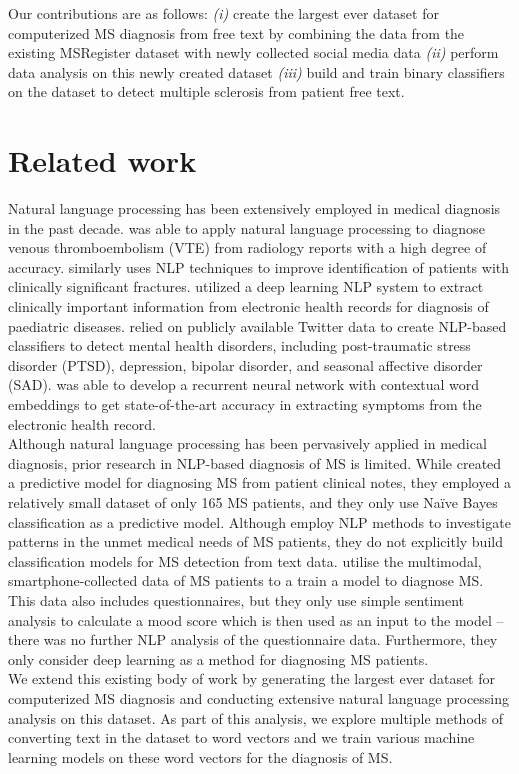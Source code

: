 \documentclass[11pt,a4paper]{article}
\begin{document}
\indent Our contributions are as follows: \emph{(i)} create the largest ever dataset for computerized MS diagnosis from free text by combining the data from the existing MSRegister dataset with newly collected social media data \emph{(ii)} perform data analysis on this newly created dataset \emph{(iii)} build and train binary classifiers on the dataset to detect multiple sclerosis from patient free text.
\section{Related work}
Natural language processing has been extensively employed in medical diagnosis in the past decade. \citet{Swartz:17} was able to apply natural language processing to diagnose venous thromboembolism (VTE) from radiology reports with a high degree of accuracy.
\citet{Kolanu:20} similarly uses NLP techniques to improve identification of patients with clinically significant fractures. \citet{Liang:19} utilized a deep learning NLP system to extract clinically important information from electronic health records for diagnosis of paediatric diseases. \citet{Coppersmith:14} relied on publicly available Twitter data to create NLP-based classifiers to detect mental health disorders, including post-traumatic stress disorder (PTSD), depression, bipolar disorder, and seasonal affective disorder (SAD). \citet{Yang:19} was able to develop a recurrent neural network with contextual word embeddings to get state-of-the-art accuracy in extracting symptoms from the electronic health record. \\
\indent Although natural language processing has been pervasively applied in medical diagnosis, prior research in NLP-based diagnosis of MS is limited. While \citet{Chase:17} created a predictive model for diagnosing MS from patient clinical notes, they employed a relatively small dataset of only 165 MS patients, and they only use Naïve Bayes classification as a predictive model. Although \citet{Koss;Joschko:22} employ NLP methods to investigate patterns in the unmet medical needs of MS patients, they do not explicitly build classification models for MS detection from text data. \citet{Schwab;Karlen:21} utilise the multimodal, smartphone-collected data of MS patients to a train a model to diagnose MS. This data also includes questionnaires, but they only use simple sentiment analysis to calculate a mood score which is then used as an input to the model – there was no further NLP analysis of the questionnaire data. Furthermore, they only consider deep learning as a method for diagnosing MS patients. \\
\indent We extend this existing body of work by generating the largest ever dataset for computerized MS diagnosis and conducting extensive natural language processing analysis on this dataset. As part of this analysis, we explore multiple methods of converting text in the dataset to word vectors and we train various machine learning models on these word vectors for the diagnosis of MS. 
\end{document}
